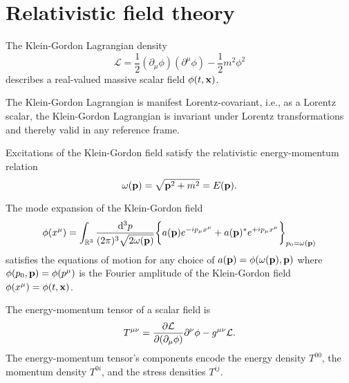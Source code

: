 \section{Relativistic field theory}

\begin{definition}
	The Klein-Gordon Lagrangian density
	\begin{equation}
		\mathcal{L}
		=
		\frac{1}{2}
		\left(\partial_\mu\phi\right)
		\left(\partial^\mu\phi\right)
		-
		\frac{1}{2}
		m^2\phi^2
		\label{eq:kg_lagrangian}
	\end{equation}
	describes a real-valued massive scalar field $\phi(t,\vb{x})$.
\end{definition}
\begin{corollary}
	The Klein-Gordon Lagrangian is manifest Lorentz-covariant, i.e., as a Lorentz scalar, the Klein-Gordon Lagrangian is invariant under Lorentz transformations and thereby valid in any reference frame.
\end{corollary}
\begin{theorem}\label{th:relativistic_energy_momentum}
	Excitations of the Klein-Gordon field satisfy the relativistic energy-momentum relation
	\begin{equation}
		\omega(\vb{p})
		=
		\sqrt{\vb{p}^2+m^2}
		=
		E(\vb{p})
		\label{eq:energy_momentum_relation}
		.
	\end{equation}
\end{theorem}
\begin{theorem}\label{thm:kg_fourier_expansion}
	The mode expansion of the Klein-Gordon field
	\begin{equation}
		\phi(x^\mu)
		=
		\int_{\mathbb{R}^3}\frac{\dd[3]{p}}{(2\pi)^3\sqrt{2\omega(\vb{p})}}
		\biggl\{
			a(\vb{p})
			e^{-ip_\mu x^\mu}
			+
			a(\vb{p})^*
			e^{+ip_\mu x^\mu}
		\biggr\}_{p_0=\omega(\vb{p})}
	\end{equation}
	satisfies the equations of motion for any choice of $a(\vb{p})=\phi(\omega(\vb{p}),\vb{p})$ where $\phi(p_0,\vb{p})=\phi(p^\mu)$ is the Fourier amplitude of the Klein-Gordon field $\phi(x^\mu)=\phi(t,\vb{x})$.
\end{theorem}
\begin{definition}
	The energy-momentum tensor of a scalar field is
	\begin{equation}
		T^{\mu\nu}
		=
		\pdv{\mathcal{L}}{(\partial_\mu\phi)}\partial^\nu\phi
		-
		g^{\mu\nu}\mathcal{L}
		\label{eq:energy_momentum_tensor}
		.
	\end{equation}
	The energy-momentum tensor's components encode the energy density $T^{00}$, the momentum density $T^{0i}$, and the stress densities $T^{ij}$.
\end{definition}
